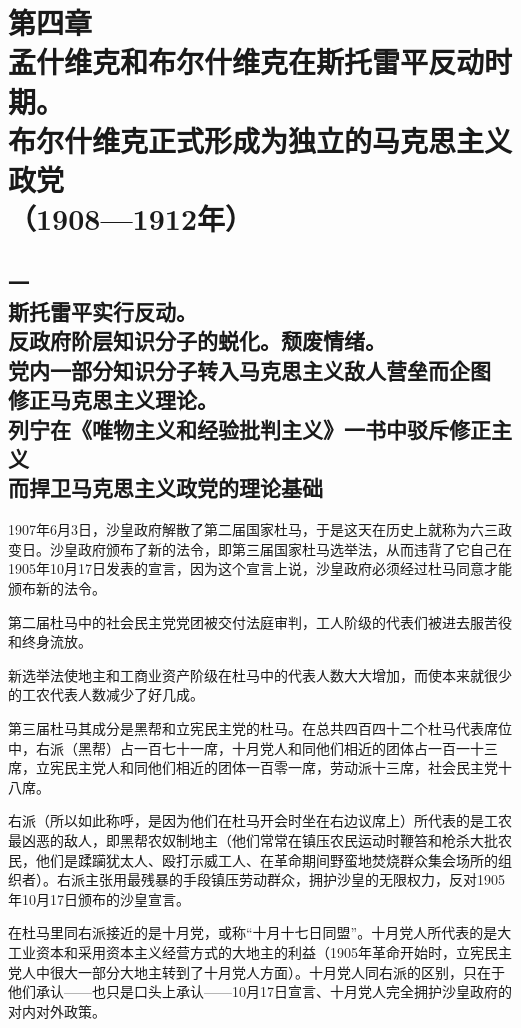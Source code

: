 \section[第四章\q 孟什维克和布尔什维克在斯托雷平反动时期。布尔什维克正式形成为独立的马克思主义政党（1908—1912年）]{第四章\\ 孟什维克和布尔什维克在斯托雷平反动时期。\\布尔什维克正式形成为独立的马克思主义政党 \\{（1908—1912年）}}

\subsection[一\q 斯托雷平实行反动。反政府阶层知识分子的蜕化。颓废情绪。党内一部分知识分子转入马克思主义敌人营垒而企图修正马克思主义理论。列宁在《唯物主义和经验批判主义》一书中驳斥修正主义而捍卫马克思主义政党的理论基础]{一\\ 斯托雷平实行反动。\\ 反政府阶层知识分子的蜕化。颓废情绪。\\党内一部分知识分子转入马克思主义敌人营垒而企图\\修正马克思主义理论。\\列宁在《唯物主义和经验批判主义》一书中驳斥修正主义\\而捍卫马克思主义政党的理论基础}

1907年6月3日，沙皇政府解散了第二届国家杜马，于是这天在历史上就称为六三政变日。沙皇政府颁布了新的法令，即第三届国家杜马选举法，从而违背了它自己在1905年10月17日发表的宣言，因为这个宣言上说，沙皇政府必须经过杜马同意才能颁布新的法令。

第二届杜马中的社会民主党党团被交付法庭审判，工人阶级的代表们被进去服苦役和终身流放。

新选举法使地主和工商业资产阶级在杜马中的代表人数大大增加，而使本来就很少的工农代表人数减少了好几成。

第三届杜马其成分是黑帮和立宪民主党的杜马。在总共四百四十二个杜马代表席位中，右派（黑帮）占一百七十一席，十月党人和同他们相近的团体占一百一十三席，立宪民主党人和同他们相近的团体一百零一席，劳动派十三席，社会民主党十八席。

右派（所以如此称呼，是因为他们在杜马开会时坐在右边议席上）所代表的是工农最凶恶的敌人，即黑帮农奴制地主（他们常常在镇压农民运动时鞭笞和枪杀大批农民，他们是蹂躏犹太人、殴打示威工人、在革命期间野蛮地焚烧群众集会场所的组织者）。右派主张用最残暴的手段镇压劳动群众，拥护沙皇的无限权力，反对1905年10月17日颁布的沙皇宣言。

在杜马里同右派接近的是十月党，或称“十月十七日同盟”。十月党人所代表的是大工业资本和采用资本主义经营方式的大地主的利益（1905年革命开始时，立宪民主党人中很大一部分大地主转到了十月党人方面）。十月党人同右派的区别，只在于他们承认——也只是口头上承认——10月17日宣言、十月党人完全拥护沙皇政府的对内对外政策。

